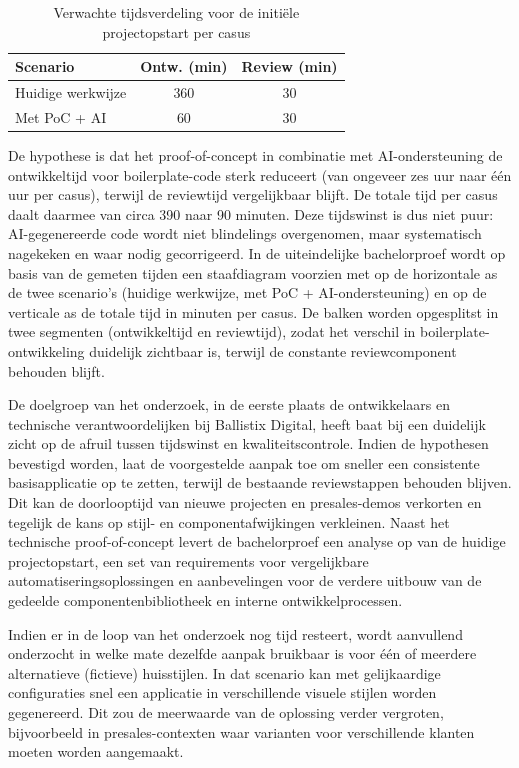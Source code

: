 \begin{table}[ht]
  \centering
  \caption{Verwachte tijdsverdeling voor de initiële projectopstart per casus}
  \label{tab:verwachte_tijd}
  \small
  \begin{tabular}{lcc} 
    \toprule
    \textbf{Scenario} & \textbf{Ontw. (min)} & \textbf{Review (min)} \\
    \midrule
    Huidige werkwijze & 360 & 30 \\
    Met PoC + AI & 60 & 30 \\
    \bottomrule
  \end{tabular}
\end{table}

De hypothese is dat het proof-of-concept in combinatie met AI-ondersteuning de ontwikkeltijd voor boilerplate-code sterk reduceert (van ongeveer zes uur naar één uur per casus), terwijl de reviewtijd vergelijkbaar blijft. De totale tijd per casus daalt daarmee van circa 390 naar 90 minuten. Deze tijdswinst is dus niet puur: AI-gegenereerde code wordt niet blindelings overgenomen, maar systematisch nagekeken en waar nodig gecorrigeerd. In de uiteindelijke bachelorproef wordt op basis van de gemeten tijden een staafdiagram voorzien met op de horizontale as de twee scenario's (huidige werkwijze, met PoC + AI-ondersteuning) en op de verticale as de totale tijd in minuten per casus. De balken worden opgesplitst in twee segmenten (ontwikkeltijd en reviewtijd), zodat het verschil in boilerplate-ontwikkeling duidelijk zichtbaar is, terwijl de constante reviewcomponent behouden blijft.

De doelgroep van het onderzoek, in de eerste plaats de ontwikkelaars en technische verantwoordelijken bij Ballistix Digital, heeft baat bij een duidelijk zicht op de afruil tussen tijdswinst en kwaliteitscontrole. Indien de hypothesen bevestigd worden, laat de voorgestelde aanpak toe om sneller een consistente basisapplicatie op te zetten, terwijl de bestaande reviewstappen behouden blijven. Dit kan de doorlooptijd van nieuwe projecten en presales-demos verkorten en tegelijk de kans op stijl- en componentafwijkingen verkleinen. Naast het technische proof-of-concept levert de bachelorproef een analyse op van de huidige projectopstart, een set van requirements voor vergelijkbare automatiseringsoplossingen en aanbevelingen voor de verdere uitbouw van de gedeelde componentenbibliotheek en interne ontwikkelprocessen. 

Indien er in de loop van het onderzoek nog tijd resteert, wordt aanvullend onderzocht in welke mate dezelfde aanpak bruikbaar is voor één of meerdere alternatieve (fictieve) huisstijlen. In dat scenario kan met gelijkaardige configuraties snel een applicatie in verschillende visuele stijlen worden gegenereerd. Dit zou de meerwaarde van de oplossing verder vergroten, bijvoorbeeld in presales-contexten waar varianten voor verschillende klanten moeten worden aangemaakt.